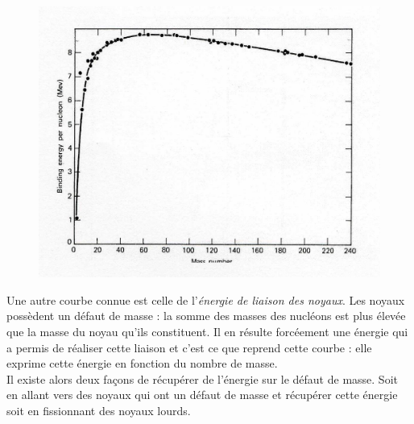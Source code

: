 	\begin{figure}
	\vspace{-8mm}
	\includegraphics[scale=0.13]{ch1/image2.png}
	\end{figure}
Une autre courbe connue est celle de l'\textit{énergie de liaison des noyaux}. Les noyaux 
possèdent un défaut de masse : la somme des masses des nucléons est plus élevée que la 
masse du noyau qu'ils constituent. Il en résulte forcéement une énergie qui a permis de 
réaliser cette liaison et c'est ce que reprend cette courbe : elle exprime cette énergie 
en fonction du nombre de masse.\\

Il existe alors deux façons de récupérer de l'énergie sur le défaut de masse. Soit en allant 
vers des noyaux qui ont un défaut de masse et récupérer cette énergie soit en fissionnant 
des noyaux lourds. 

